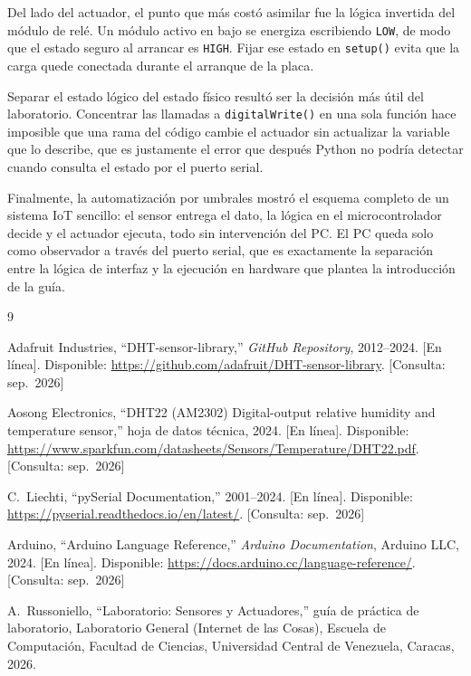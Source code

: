 Del lado del actuador, el punto que más costó asimilar fue la lógica invertida del módulo
de relé. Un módulo activo en bajo se energiza escribiendo \texttt{LOW}, de modo que el
estado seguro al arrancar es \texttt{HIGH}. Fijar ese estado en \texttt{setup()} evita que
la carga quede conectada durante el arranque de la placa.

Separar el estado lógico del estado físico resultó ser la decisión más útil del
laboratorio. Concentrar las llamadas a \texttt{digitalWrite()} en una sola función hace
imposible que una rama del código cambie el actuador sin actualizar la variable que lo
describe, que es justamente el error que después Python no podría detectar cuando consulta
el estado por el puerto serial.

Finalmente, la automatización por umbrales mostró el esquema completo de un sistema IoT
sencillo: el sensor entrega el dato, la lógica en el microcontrolador decide y el actuador
ejecuta, todo sin intervención del PC. El PC queda solo como observador a través del
puerto serial, que es exactamente la separación entre la lógica de interfaz y la ejecución
en hardware que plantea la introducción de la guía.

\clearpage
\begingroup
\small
\begin{thebibliography}{9}

Adafruit Industries, ``DHT-sensor-library,'' \emph{GitHub Repository}, 2012--2024.
[En línea]. Disponible: \url{https://github.com/adafruit/DHT-sensor-library}.
[Consulta: sep.~2026]

Aosong Electronics, ``DHT22 (AM2302) Digital-output relative humidity and temperature
sensor,'' hoja de datos técnica, 2024. [En línea]. Disponible:
\url{https://www.sparkfun.com/datasheets/Sensors/Temperature/DHT22.pdf}.
[Consulta: sep.~2026]

C.~Liechti, ``pySerial Documentation,'' 2001--2024. [En línea]. Disponible:
\url{https://pyserial.readthedocs.io/en/latest/}. [Consulta: sep.~2026]

Arduino, ``Arduino Language Reference,'' \emph{Arduino Documentation}, Arduino LLC, 2024.
[En línea]. Disponible: \url{https://docs.arduino.cc/language-reference/}.
[Consulta: sep.~2026]

A.~Russoniello, ``Laboratorio: Sensores y Actuadores,'' guía de práctica de laboratorio,
Laboratorio General (Internet de las Cosas), Escuela de Computación,
Facultad de Ciencias, Universidad Central de Venezuela, Caracas, 2026.

\end{thebibliography}
\endgroup


